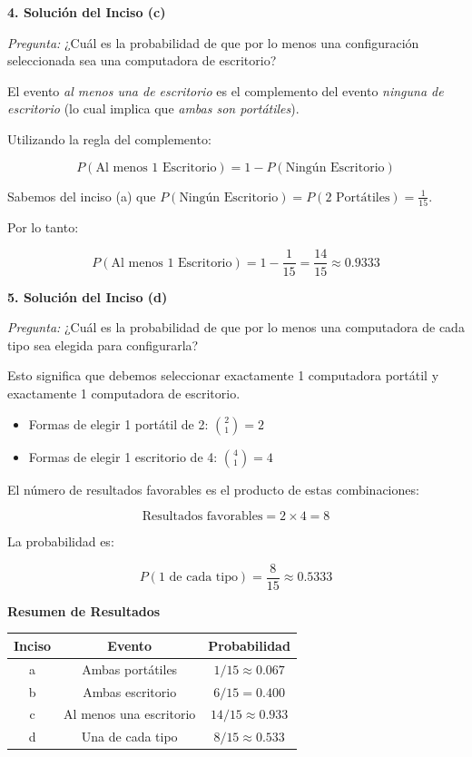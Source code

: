 \documentclass[a4paper]{article}
\begin{document}
\vspace{0.3cm}

\textbf{4. Solución del Inciso (c)}

\textit{Pregunta:} ¿Cuál es la probabilidad de que por lo menos una configuración seleccionada sea una computadora de escritorio?

El evento \textit{al menos una de escritorio} es el complemento del evento \textit{ninguna de escritorio} (lo cual implica que \textit{ambas son portátiles}).

Utilizando la regla del complemento:

$$ P(\text{Al menos 1 Escritorio}) = 1 - P(\text{Ningún Escritorio}) $$

Sabemos del inciso (a) que $P(\text{Ningún Escritorio}) = P(\text{2 Portátiles}) = \frac{1}{15}$.

Por lo tanto:

$$ P(\text{Al menos 1 Escritorio}) = 1 - \frac{1}{15} = \frac{14}{15} \approx 0.9333 $$

\vspace{0.3cm}

\textbf{5. Solución del Inciso (d)}

\textit{Pregunta:} ¿Cuál es la probabilidad de que por lo menos una computadora de cada tipo sea elegida para configurarla?

Esto significa que debemos seleccionar exactamente 1 computadora portátil y exactamente 1 computadora de escritorio.

\begin{itemize}
    \item Formas de elegir 1 portátil de 2: $\binom{2}{1} = 2$
    \item Formas de elegir 1 escritorio de 4: $\binom{4}{1} = 4$
\end{itemize}

El número de resultados favorables es el producto de estas combinaciones:

$$ \text{Resultados favorables} = 2 \times 4 = 8 $$

La probabilidad es:

$$ P(\text{1 de cada tipo}) = \frac{8}{15} \approx 0.5333 $$

\vspace{0.5cm}

\textbf{Resumen de Resultados}

\begin{center}
\begin{tabular}{|c|c|c|}
\hline
\textbf{Inciso} & \textbf{Evento} & \textbf{Probabilidad} \\
\hline
a & Ambas portátiles & $1/15 \approx 0.067$ \\
\hline
b & Ambas escritorio & $6/15 = 0.400$ \\
\hline
c & Al menos una escritorio & $14/15 \approx 0.933$ \\
\hline
d & Una de cada tipo & $8/15 \approx 0.533$ \\
\hline
\end{tabular}
\end{center}
\end{document}
